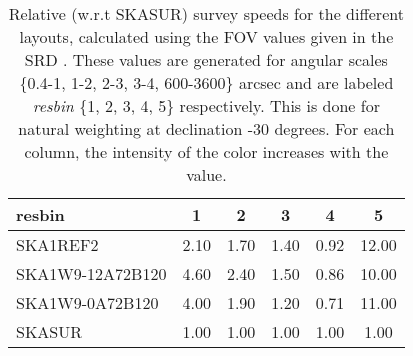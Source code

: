  \begin{table}[!htp]
 \tiny{ 
\begin{tabular}{|lccccc|} \hline 
 resbin & 1 & 2 & 3 & 4 & 5 \tabularnewline \hline
SKA1REF2 & 2.10 \cellcolor{blue!30.83} & 1.70 \cellcolor{red!39.00} & 1.40 \cellcolor{green!51.60} & 0.92 \cellcolor{orange!48.41}
& 12.00 \cellcolor{purple!60.00}\\ \hline 
SKA1W9-12A72B120 & 4.60 \cellcolor{blue!60.00} & 2.40 \cellcolor{red!60.00} & 1.50 \cellcolor{green!60.00} & 0.86
\cellcolor{orange!39.72} & 10.00 \cellcolor{purple!52.36}\\ \hline 
SKA1W9-0A72B120 & 4.00 \cellcolor{blue!53.00} & 1.90 \cellcolor{red!45.00} & 1.20 \cellcolor{green!34.80} & 0.71
\cellcolor{orange!18.00} & 11.00 \cellcolor{purple!56.18}\\ \hline 
SKASUR & 1.00 \cellcolor{blue!18.00} & 1.00 \cellcolor{red!18.00} & 1.00 \cellcolor{green!18.00} & 1.00 \cellcolor{orange!60.00} &
1.00 \cellcolor{purple!18.00}\tabularnewline \hline 
\end{tabular}\hfil
\caption{Relative (w.r.t SKASUR) survey speeds for the different layouts, calculated using the FOV values given in the SRD
\cite{srd}. These values are generated for angular scales \{0.4-1, 1-2, 2-3, 3-4, 600-3600\} arcsec and are labeled {\it resbin}
\{1, 2, 3, 4, 5\} respectively. This is done for natural weighting at declination -30 degrees. For each column, the
intensity of the color increases with the value.}\label{tab:speed-mix_sefd}}
\end{table}